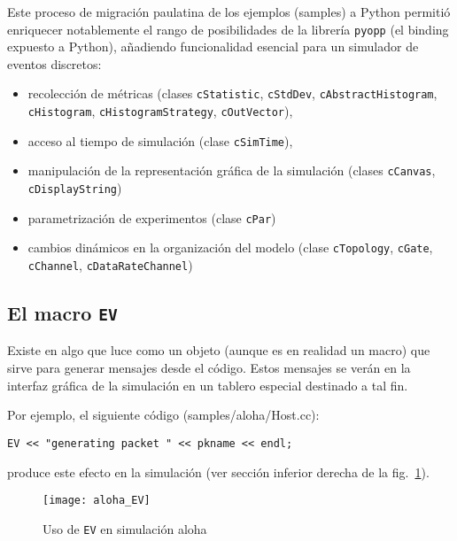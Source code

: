 Este proceso de migración paulatina de los ejemplos (samples) a Python permitió
enriquecer notablemente el rango de posibilidades de la librería \verb!pyopp!
(el binding expuesto a Python), añadiendo funcionalidad esencial para un
simulador de eventos discretos:

\begin{itemize}
    \item recolección de métricas (clases \verb!cStatistic!, \verb!cStdDev!,
\verb!cAbstractHistogram!, \verb!cHistogram!, \verb!cHistogramStrategy!,
\verb!cOutVector!),

    \item acceso al tiempo de simulación (clase \verb!cSimTime!),

    \item manipulación de la representación gráfica de la simulación (clases
\verb!cCanvas!, \verb!cDisplayString!)

    \item parametrización de experimentos (clase \verb!cPar!)

    \item cambios dinámicos en la organización del modelo (clase
\verb!cTopology!, \verb!cGate!, \verb!cChannel!, \verb!cDataRateChannel!)
\end{itemize}

\subsection{El macro \texttt{EV}}\label{subsec:ev}

Existe en \omnetpp{} algo que luce como un objeto (aunque es en realidad un macro)
que sirve para generar mensajes desde el código. Estos mensajes se verán en la
interfaz gráfica de la simulación en un tablero especial destinado a tal fin.

Por ejemplo, el siguiente código (samples/aloha/Host.cc):

\begin{verbatim}
EV << "generating packet " << pkname << endl;
\end{verbatim}

\noindent produce este efecto en la simulación (ver sección inferior derecha de
la fig.~\ref{fig:aloha_EV}).

\begin{figure}[h]
\caption{Uso de \texttt{EV} en simulación aloha}
\label{fig:aloha_EV}
\centering
\texttt{[image: aloha\_EV]}
\end{figure}

